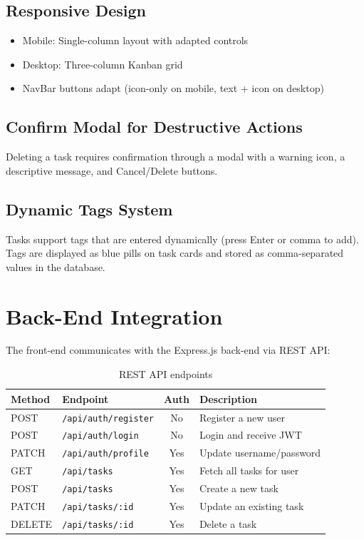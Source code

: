 \documentclass[12pt, a4paper]{article}
\begin{document}
\subsection{Responsive Design}

\begin{itemize}[nosep]
    \item Mobile: Single-column layout with adapted controls
    \item Desktop: Three-column Kanban grid
    \item NavBar buttons adapt (icon-only on mobile, text + icon on desktop)
\end{itemize}

\subsection{Confirm Modal for Destructive Actions}

Deleting a task requires confirmation through a modal with a warning icon, a descriptive message, and Cancel/Delete buttons.

\subsection{Dynamic Tags System}

Tasks support tags that are entered dynamically (press Enter or comma to add). Tags are displayed as blue pills on task cards and stored as comma-separated values in the database.

\section{Back-End Integration}

The front-end communicates with the Express.js back-end via REST API:

\begin{table}[H]
\centering
\begin{tabularx}{\textwidth}{llcX}
\toprule
\textbf{Method} & \textbf{Endpoint} & \textbf{Auth} & \textbf{Description} \\
\midrule
POST   & \texttt{/api/auth/register} & No  & Register a new user \\
POST   & \texttt{/api/auth/login}    & No  & Login and receive JWT \\
PATCH  & \texttt{/api/auth/profile}  & Yes & Update username/password \\
GET    & \texttt{/api/tasks}         & Yes & Fetch all tasks for user \\
POST   & \texttt{/api/tasks}         & Yes & Create a new task \\
PATCH  & \texttt{/api/tasks/:id}     & Yes & Update an existing task \\
DELETE & \texttt{/api/tasks/:id}     & Yes & Delete a task \\
\bottomrule
\end{tabularx}
\caption{REST API endpoints}
\end{table}
\end{document}
